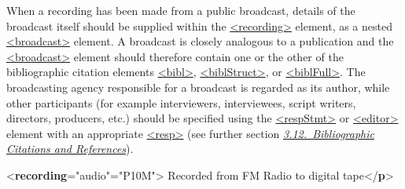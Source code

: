 When a recording has been made from a public broadcast, details of the broadcast itself should be supplied within the \hyperref[TEI.recording]{<recording>} element, as a nested \hyperref[TEI.broadcast]{<broadcast>} element. A broadcast is closely analogous to a publication and the \hyperref[TEI.broadcast]{<broadcast>} element should therefore contain one or the other of the bibliographic citation elements \hyperref[TEI.bibl]{<bibl>}, \hyperref[TEI.biblStruct]{<biblStruct>}, or \hyperref[TEI.biblFull]{<biblFull>}. The broadcasting agency responsible for a broadcast is regarded as its author, while other participants (for example interviewers, interviewees, script writers, directors, producers, etc.) should be specified using the \hyperref[TEI.respStmt]{<respStmt>} or \hyperref[TEI.editor]{<editor>} element with an appropriate \hyperref[TEI.resp]{<resp>} (see further section \textit{\hyperref[COBI]{3.12.\ Bibliographic Citations and References}}). \par\bgroup{}\exampleFont \begin{shaded}\noindent\mbox{}{<\textbf{recording}\hspace*{1em}{type}="{audio}"\hspace*{1em}{dur}="{P10M}">}\mbox{}\newline 
{}\mbox{}\newline 
\hspace*{1em}Recorded from FM Radio to digital tape{</\textbf{p}>}\mbox{}\newline 
{}\mbox{}\newline 
{}\mbox{}\newline 

\end{shaded}
